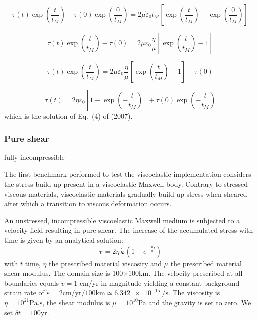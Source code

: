 \[
\tau(t) \exp\left( \frac{t}{t_M}   \right)
-
\tau(0) \exp\left( \frac{0}{t_M}   \right)
 =
 2\mu \dot\varepsilon_0  t_M  [ \exp\left( \frac{t}{t_M}   \right)  -  \exp\left( \frac{0}{t_M} \right) ]
\]

\[
\tau(t) \exp\left( \frac{t}{t_M}   \right)
- \tau(0) 
=
2 \mu  \dot\varepsilon_0 \frac{\eta}{\mu} [ \exp\left( \frac{t}{t_M}   \right) -1 ]
\]

\[
\tau(t) \exp\left( \frac{t}{t_M} \right)
=
2 \mu  \dot\varepsilon_0 \frac{\eta}{\mu} [ \exp\left( \frac{t}{t_M}   \right) -1 ] + \tau(0) 
\]

\[
\tau(t) 
=
2 \eta  \dot\varepsilon_0  [1- \exp\left( -\frac{t}{t_M}\right) ] + \tau(0) \exp\left( -\frac{t}{t_M} \right)
\]
which is the solution of Eq.~(4) of \textcite{kabe07} (2007).























\subsubsection{Pure shear}


{\color{orange} fully incompressible}

The first benchmark performed to test the viscoelastic implementation considers the stress
build-up present in a viscoelastic Maxwell body. Contrary to stressed viscous materials,
viscoelastic materials gradually build-up stress when sheared after which a transition to viscous deformation occurs.

An unstressed, incompressible viscoelastic Maxwell medium is subjected to a velocity field
resulting in pure shear.
The increase of the accumulated stress with time is given by an analytical solution:
\begin{equation}
{\bm \tau} = 2\eta\ {\dot{\bm \varepsilon}} \left ( 1-e^{-\frac{\mu }{\eta} t } \right )
\end{equation}
with $t$ time, $\eta$ the prescribed material viscosity and $\mu$ the prescribed material shear modulus.
The domain size is 100$\times 100$km.
The velocity prescribed at all boundaries equals $v=1$ cm/yr in magnitude yielding a constant
background strain rate of $\dot{\varepsilon}=2\text{cm/yr}/100\text{km}\simeq \SI{6.342e-15}{\per\second}$.
The viscosity is $\eta= 10^{21}\text{Pa.s}$, the shear modulus is
$\mu =10^{10}$Pa and the gravity is set to zero. We set $\delta t=100$yr.

